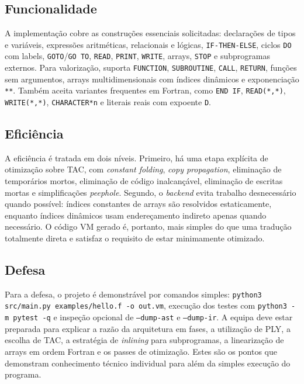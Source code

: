\documentclass{article}
\begin{document}
\subsection{Funcionalidade}

A implementação cobre as construções essenciais solicitadas: declarações de tipos e
variáveis, expressões aritméticas, relacionais e lógicas, \texttt{IF-THEN-ELSE}, ciclos
\texttt{DO} com labels, \texttt{GOTO}/\texttt{GO TO}, \texttt{READ}, \texttt{PRINT},
\texttt{WRITE}, arrays, \texttt{STOP} e subprogramas externos. Para valorização, suporta
\texttt{FUNCTION}, \texttt{SUBROUTINE}, \texttt{CALL}, \texttt{RETURN}, funções sem
argumentos, arrays multidimensionais com índices dinâmicos e exponenciação \texttt{**}.
Também aceita variantes frequentes em Fortran, como \texttt{END IF}, \texttt{READ(*,*)},
\texttt{WRITE(*,*)}, \texttt{CHARACTER*n} e literais reais com expoente \texttt{D}.

\subsection{Eficiência}

A eficiência é tratada em dois níveis. Primeiro, há uma etapa explícita de otimização sobre
TAC, com \textit{constant folding}, \textit{copy propagation}, eliminação de temporários
mortos, eliminação de código inalcançável, eliminação de escritas mortas e simplificações
\textit{peephole}. Segundo, o \textit{backend} evita trabalho desnecessário quando possível:
índices constantes de arrays são resolvidos estaticamente, enquanto índices dinâmicos usam
endereçamento indireto apenas quando necessário. O código VM gerado é, portanto, mais simples
do que uma tradução totalmente direta e satisfaz o requisito de estar minimamente otimizado.

\subsection{Defesa}

Para a defesa, o projeto é demonstrável por comandos simples:
\texttt{python3 src/main.py examples/hello.f -o out.vm}, execução dos testes com
\texttt{python3 -m pytest -q} e inspeção opcional de \texttt{--dump-ast} e
\texttt{--dump-ir}. A equipa deve estar preparada para explicar a razão da arquitetura em
fases, a utilização de PLY, a escolha de TAC, a estratégia de \textit{inlining} para
subprogramas, a linearização de arrays em ordem Fortran e os passes de otimização. Estes são
os pontos que demonstram conhecimento técnico individual para além da simples execução do
programa.
\end{document}
